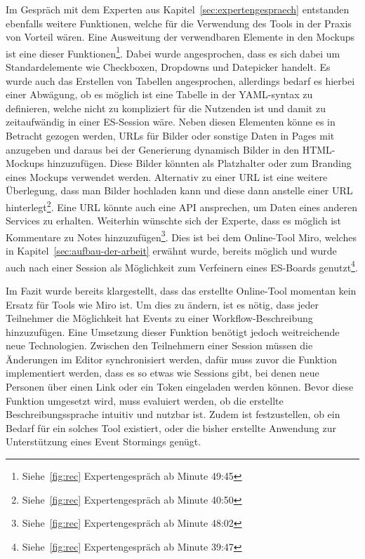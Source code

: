 Im Gespräch mit dem Experten aus Kapitel~\ref{sec:expertengespraech} entstanden ebenfalls weitere Funktionen, welche für die Verwendung des Tools in der Praxis von Vorteil wären.
Eine Ausweitung der verwendbaren Elemente in den Mockups ist eine dieser Funktionen\footnote{Siehe~\ref{fig:rec} Expertengespräch ab Minute  49:45}.
Dabei wurde angesprochen, dass es sich dabei um Standardelemente wie Checkboxen, Dropdowns und Datepicker handelt.
Es wurde auch das Erstellen von Tabellen angesprochen, allerdings bedarf es hierbei einer Abwägung, ob es möglich ist eine Tabelle in der YAML-syntax zu definieren,
welche nicht zu kompliziert für die Nutzenden ist und damit zu zeitaufwändig in einer \ac{ES}-Session wäre.
Neben diesen Elementen könne es in Betracht gezogen werden, URLs für Bilder oder sonstige Daten in Pages mit anzugeben und
daraus bei der Generierung dynamisch Bilder in den HTML-Mockups hinzuzufügen.
Diese Bilder könnten als Platzhalter oder zum Branding eines Mockups verwendet werden.
Alternativ zu einer URL ist eine weitere Überlegung, dass man Bilder hochladen kann und diese dann anstelle einer URL hinterlegt\footnote{Siehe~\ref{fig:rec} Expertengespräch ab Minute  40:50}.
Eine URL könnte auch eine API ansprechen, um Daten eines anderen Services zu erhalten.
Weiterhin wünschte sich der Experte, dass es möglich ist Kommentare zu Notes hinzuzufügen\footnote{Siehe~\ref{fig:rec} Expertengespräch ab Minute  48:02}.
Dies ist bei dem Online-Tool Miro, welches in Kapitel~\ref{sec:aufbau-der-arbeit} erwähnt wurde, bereits möglich und wurde auch nach einer Session als Möglichkeit
zum Verfeinern eines \ac{ES}-Boards genutzt\footnote{Siehe~\ref{fig:rec} Expertengespräch ab Minute  39:47}.

Im Fazit wurde bereits klargestellt, dass das erstellte Online-Tool momentan kein Ersatz für Tools wie Miro ist.
Um dies zu ändern, ist es nötig, dass jeder Teilnehmer die Möglichkeit hat Events zu einer Workflow-Beschreibung hinzuzufügen.
Eine Umsetzung dieser Funktion benötigt jedoch weitreichende neue Technologien.
Zwischen den Teilnehmern einer Session müssen die Änderungen im Editor synchronisiert werden, dafür muss zuvor die Funktion
implementiert werden, dass es so etwas wie Sessions gibt, bei denen neue Personen über einen Link oder ein Token eingeladen werden können.
Bevor diese Funktion umgesetzt wird, muss evaluiert werden, ob die erstellte Beschreibungssprache intuitiv und nutzbar ist.
Zudem ist festzustellen, ob ein Bedarf für ein solches Tool existiert, oder die bisher erstellte Anwendung zur Unterstützung eines Event Stormings genügt.

